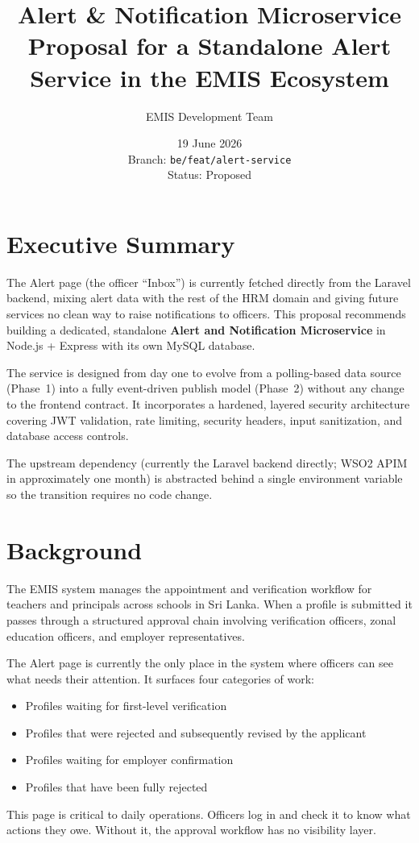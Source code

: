 \documentclass[11pt]{article}
\title{%
  \color{accent}\textbf{Alert \& Notification Microservice}\\[6pt]
  \large\normalfont\color{black}
  Proposal for a Standalone Alert Service in the EMIS Ecosystem
}
\author{EMIS Development Team}
\date{19 June 2026 \\ Branch: \texttt{be/feat/alert-service} \\ Status: Proposed}
\begin{document}
\maketitle
\thispagestyle{empty}
\vspace{0.4cm}

\section*{Executive Summary}

The Alert page (the officer ``Inbox'') is currently fetched directly from the Laravel backend,
mixing alert data with the rest of the HRM domain and giving future services no clean way to
raise notifications to officers. This proposal recommends building a dedicated, standalone
\textbf{Alert and Notification Microservice} in Node.js + Express with its own MySQL database.

The service is designed from day one to evolve from a polling-based data source (Phase~1)
into a fully event-driven publish model (Phase~2) without any change to the frontend contract.
It incorporates a hardened, layered security architecture covering JWT validation, rate limiting,
security headers, input sanitization, and database access controls.

The upstream dependency (currently the Laravel backend directly; WSO2 APIM in approximately
one month) is abstracted behind a single environment variable so the transition requires no
code change.

\newpage
\tableofcontents
\newpage

\section{Background}

The EMIS system manages the appointment and verification workflow for teachers and principals
across schools in Sri Lanka. When a profile is submitted it passes through a structured
approval chain involving verification officers, zonal education officers, and employer
representatives.

The Alert page is currently the only place in the system where officers can see what needs
their attention. It surfaces four categories of work:
\begin{itemize}
  \item Profiles waiting for first-level verification
  \item Profiles that were rejected and subsequently revised by the applicant
  \item Profiles waiting for employer confirmation
  \item Profiles that have been fully rejected
\end{itemize}
This page is critical to daily operations. Officers log in and check it to know what actions
they owe. Without it, the approval workflow has no visibility layer.
\end{document}
